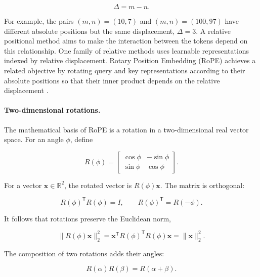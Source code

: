 \begin{equation}
    \Delta=m-n.
    \label{eq:pe-relative-displacement}
\end{equation}

For example, the pairs \((m,n)=(10,7)\) and \((m,n)=(100,97)\) have
different absolute positions but the same displacement, \(\Delta=3\).
A relative positional method aims to make the interaction between the
tokens depend on this relationship. One family of relative methods uses
learnable representations indexed by relative displacement. Rotary
Position Embedding (RoPE) achieves a related objective by rotating query
and key representations according to their absolute positions so that
their inner product depends on the relative displacement
\parencite{zhou2024rethinking,zhang2024foundmiddle}.

\paragraph{Two-dimensional rotations.}
The mathematical basis of RoPE is a rotation in a two-dimensional real
vector space. For an angle \(\phi\), define

\begin{equation}
    R(\phi)=
    \begin{bmatrix}
        \cos\phi&-\sin\phi\\
        \sin\phi&\cos\phi
    \end{bmatrix}.
    \label{eq:pe-rotation-matrix}
\end{equation}

For a vector \(\mathbf{x}\in\mathbb{R}^2\), the rotated vector is
\(R(\phi)\mathbf{x}\). The matrix is orthogonal:

\begin{equation}
    R(\phi)^{\mathsf T}R(\phi)=I,
    \qquad
    R(\phi)^{\mathsf T}=R(-\phi).
    \label{eq:pe-rotation-orthogonality}
\end{equation}

It follows that rotations preserve the Euclidean norm,

\begin{equation}
    \|R(\phi)\mathbf{x}\|_2^2
    =
    \mathbf{x}^{\mathsf T}R(\phi)^{\mathsf T}
    R(\phi)\mathbf{x}
    =
    \|\mathbf{x}\|_2^2.
    \label{eq:pe-rotation-norm}
\end{equation}

The composition of two rotations adds their angles:

\begin{equation}
    R(\alpha)R(\beta)=R(\alpha+\beta).
    \label{eq:pe-rotation-composition}
\end{equation}

